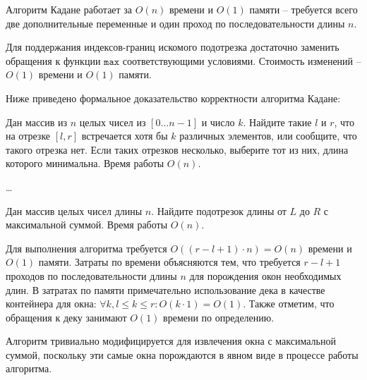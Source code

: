 \begin{solution}
    \leavevmode\vspace{1pt}
    

    Алгоритм Кадане работает за \( O(n) \) времени и \( O(1) \) памяти -- требуется всего две
    дополнительные переменные и один проход по последовательности длины $n$.

    Для поддержания индексов-границ искомого подотрезка достаточно заменить обращения к функции $\mathtt{max}$
    соответствующими условиями. Стоимость изменений -- \( O(1) \) времени и \( O(1) \) памяти.

    Ниже приведено формальное доказательство корректности алгоритма Кадане:
    
\end{solution}


\begin{problem}
    Дан массив из $n$ целых чисел из $[0 \ldots n-1]$ и число $k$. Найдите такие $l$ и $r$, что на отрезке $[l, r]$ встречается хотя бы $k$ различных элементов, или сообщите, что такого отрезка нет. Если таких отрезков несколько, выберите тот из них, длина которого минимальна. Время работы $O(n)$.
\end{problem}

\begin{solution}
    \dots
\end{solution}


\begin{problem}
    Дан массив целых чисел длины $n$. Найдите подотрезок длины
    от $L$ до $R$ с максимальной суммой. Время работы $O(n)$.
\end{problem}

\begin{solution}
    \leavevmode\vspace{1pt}
    

    Для выполнения алгоритма требуется \( O((r - l + 1) \cdot n) = O(n) \) времени и \( O(1) \) памяти.
    Затраты по времени объясняются тем, что требуется \( r - l + 1 \) проходов по последовательности длины $n$ для порождения окон
    необходимых длин.
    В затратах по памяти примечательно использование дека в качестве контейнера для окна: \( \forall k, l \le k \le r :
    O(k \cdot 1) = O(1) \).
    Также отметим, что обращения к деку занимают \( O(1) \) времени по определению.

    Алгоритм тривиально модифицируется для извлечения окна с максимальной суммой, поскольку эти самые окна порождаются в
    явном виде в процессе работы алгоритма.
\end{solution}


